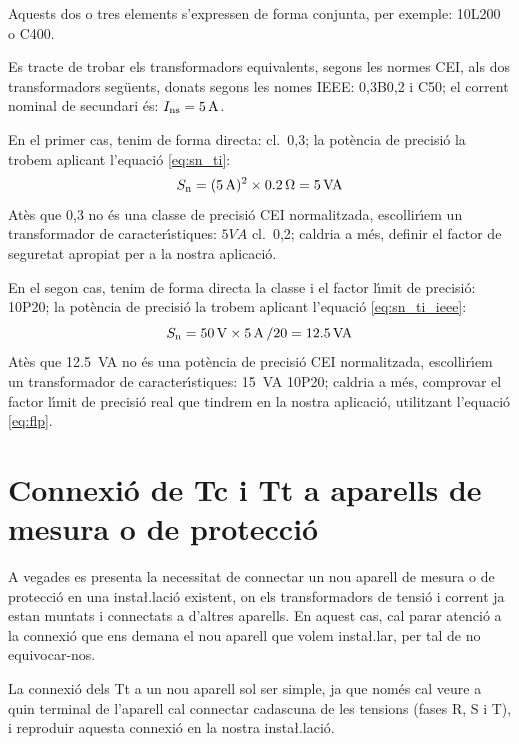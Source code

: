 Aquests dos o tres elements s'expressen de forma conjunta, per exemple:
10L200 o C400.


\begin{exemple}
    Es tracte de trobar els transformadors equivalents, segons les normes \textsf{CEI}, als dos
    transformadors seg\"{u}ents, donats segons les nomes \textsf{IEEE}: 0,3B0,2 i
    C50; el corrent nominal de secundari \'{e}s:    $I_\mathrm{ns}=5\mathrm{\,A}$.

    En el primer cas, tenim de forma directa: cl.~0,3; la pot\`{e}ncia de precisi\'{o} la trobem
    aplicant l'equaci\'{o} \eqref{eq:sn_ti}: 
    \[
        S_\mathrm{n} =(\SI{5}{A})^2 \times \SI{0,2}{\ensuremath{\mathrm{\Omega}}} =  \SI{5}{VA}
    \]
    At\`{e}s que 0,3 no \'{e}s una classe de precisi\'{o} \textsf{CEI} normalitzada,
    escollir\'{\i}em un transformador de caracter\'{\i}stiques: $5\unit{VA}$ cl.~0,2; caldria a m\'{e}s, definir el factor de
    seguretat apropiat per a la nostra aplicaci\'{o}.

    En el segon cas, tenim de forma directa la classe i el factor l\'{\i}mit de
    precisi\'{o}: 10P20; la pot\`{e}ncia de precisi\'{o} la trobem
    aplicant l'equaci\'{o} \eqref{eq:sn_ti_ieee}: 
    \[
        S_\mathrm{n} = \SI{50}{V} \times  \SI{5}{A}\, / 20 = \SI{12,5}{VA}
    \]
    At\`{e}s que \SI{12,5}{VA} no \'{e}s una pot\`{e}ncia de precisi\'{o} \textsf{CEI} normalitzada,
     escollir\'{\i}em un transformador de caracter\'{\i}stiques:
    \SI{15}{VA} 10P20; caldria a m\'{e}s, comprovar el factor l\'{\i}mit de precisi\'{o} real
    que tindrem en la nostra aplicaci\'{o}, utilitzant l'equaci\'{o} \eqref{eq:flp}.
\end{exemple}

\section{Connexi\'{o} de Tc i Tt a aparells de mesura o de
protecci\'{o}}\label{sec:conex_ti_tt}

A vegades es presenta la necessitat de connectar un nou aparell de
mesura o de protecci\'{o} en una insta{\l.l}aci\'{o} existent, on els
transformadors de tensi\'{o} i corrent ja estan muntats i connectats a
d'altres aparells. En aquest cas, cal parar atenci\'{o} a la connexi\'{o}
que ens demana el nou aparell que volem insta{\l.l}ar, per tal de no
equivocar-nos.

La connexi\'{o} dels Tt a un nou aparell sol ser simple, ja que nom\'{e}s
cal veure a quin terminal de l'aparell cal connectar cadascuna de
les tensions (fases R, S i T), i reproduir aquesta connexi\'{o} en la
nostra insta{\l.l}aci\'{o}.

